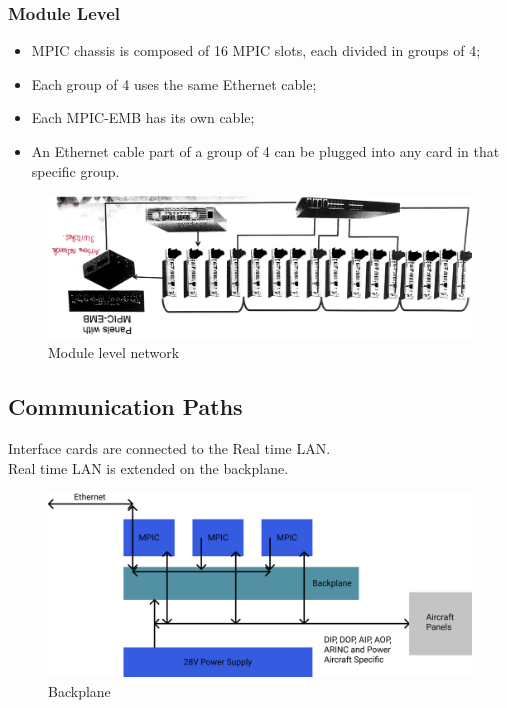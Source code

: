         \subsubsection{Module Level}
            \begin{itemize}
                \item MPIC chassis is composed of 16 MPIC slots, each divided in groups of 4;
                \item Each group of 4 uses the same Ethernet cable;
                \item Each MPIC-EMB has its own cable;
                \item An Ethernet cable part of a group of 4 can be plugged into any card in that specific group.
            \end{itemize}
            \begin{figure}
                \centering
                \includegraphics[width=0.6\linewidth]{img/Module-level.png}
                \caption{Module level network}
            \end{figure}
    \subsection{Communication Paths}
        Interface cards are connected to the Real time LAN. \\ 
        \vspace{3mm}
        Real time LAN is extended on the backplane.
        \begin{figure}[H]
            \centering
            \includegraphics[width=0.6\linewidth]{img/communication path.png}
            \caption{Backplane}
        \end{figure}
